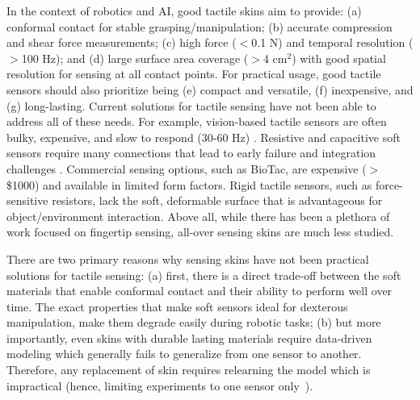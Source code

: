 \documentclass{article}
\begin{document}
In the context of robotics and AI, good tactile skins aim to provide: (a) conformal contact for stable grasping/manipulation; (b) accurate compression and shear force measurements; (c) high force ($<$0.1 N) and temporal resolution ($>$100 Hz); and (d) large surface area coverage ($>$4 cm$^2$) with good spatial resolution for sensing at all contact points. For practical usage, good tactile sensors should also prioritize being (e) compact and versatile, (f) inexpensive, and (g) long-lasting. Current solutions for tactile sensing have not been able to address all of these needs. For example, vision-based tactile sensors are often bulky, expensive, and slow to respond (30-60 Hz) \cite{lambeta2020digit,li2019elastomer}. Resistive and capacitive soft sensors require many connections that lead to early failure and integration challenges \cite{atalay2018highly, wang2018toward}. Commercial sensing options, such as BioTac, are expensive ($>$\$1000) and available in limited form factors. Rigid tactile sensors, such as force-sensitive resistors, lack the soft, deformable surface that is advantageous for object/environment interaction. Above all, while there has been a plethora of work focused on fingertip sensing, all-over sensing skins are much less studied.


There are two primary reasons why sensing skins have not been practical solutions for tactile sensing: (a) first, there is a direct trade-off between the soft materials that enable conformal contact and their ability to perform well over time. The exact properties that make soft sensors ideal for dexterous manipulation, make them degrade easily during robotic tasks; (b) but more importantly, even skins with durable lasting materials require data-driven modeling which generally fails to generalize from one sensor to another. Therefore, any replacement of skin requires relearning the model which is impractical (hence, limiting experiments to one sensor only~\cite{hellebrekers2020soft}).
\end{document}
